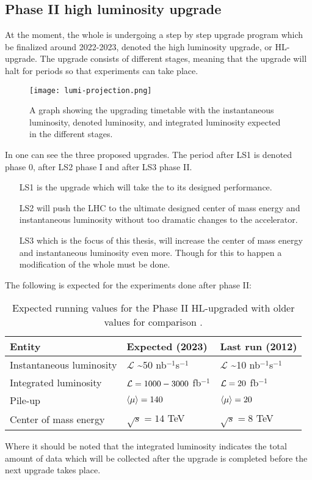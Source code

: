 \subsection{Phase II high luminosity upgrade}\label{sec:eo:subsec:hlu}
At the moment, the whole \abbrLHC is undergoing a step by step upgrade program which be finalized around 2022-2023, denoted the high luminosity upgrade, or HL-upgrade. The upgrade consists of different stages, meaning that the upgrade will halt for periods so that experiments can take place. 
\begin{figure}[ht]
\texttt{[image: lumi-projection.png]}
\caption{A graph showing the upgrading timetable with the instantaneous luminosity, denoted luminosity, and integrated luminosity expected in the different stages.}
\label{fig:upgt}
\end{figure}
In  one can see the three proposed upgrades. The period after LS1 is denoted phase 0, after LS2 phase I and after LS3 phase II. 
\begin{itemize}
\item[LS1] is the upgrade which will take the \abbrLHC to its designed performance. 

\item[LS2] will push the LHC to the ultimate designed center of mass energy and instantaneous luminosity without too dramatic changes to the accelerator. 
\item[LS3] which is the focus of this thesis, will increase the center of mass energy and instantaneous luminosity even more. Though for this to happen a modification of the whole \abbrLHC must be done.
\end{itemize}
The following is expected for the experiments done after phase II:
\renewcommand{\arraystretch}{1.5} %
\begin{table}[H]
\begin{center}
    \begin{tabular}{ | l | l | l |}
    \hline
    Entity & Expected (2023) & Last run (2012) \\ \hline
    Instantaneous luminosity & $\mathscr{L}$ \textasciitilde 50 nb$^{-1}$s$^{-1}$ & $\mathscr{L}$ \textasciitilde 10 nb$^{-1}$s$^{-1}$ \\ \hline  
    Integrated luminosity & $\mathcal{L}=1000-3000$ fb$^{-1}$ & $\mathcal{L}=20$ fb$^{-1}$ \\ \hline
  	Pile-up & $\left<\mu\right>=140$ & $\left<\mu\right>=20$ \\ \hline
  	Center of mass energy & $\sqrt{s}=14$ TeV &  $\sqrt{s}=8$ TeV \\ \hline
  	\end{tabular}
  	
  	\caption{Expected running values for the Phase II HL-upgraded \abbrLHC with older values for comparison \citep{HL:2013}.}
  	\label{tab:expectvalues}
  	\end{center}
    \end{table}
    \renewcommand{\arraystretch}{1.0}  %
Where it should be noted that the integrated luminosity indicates the total amount of data which will be collected after the upgrade is completed before the next upgrade takes place. 

